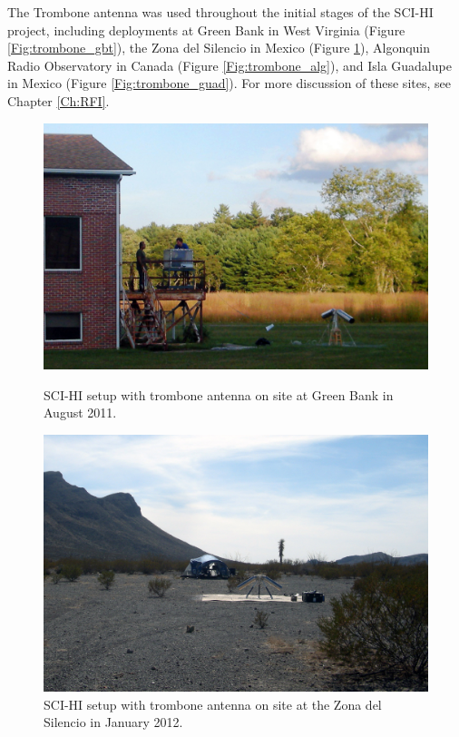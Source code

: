 The Trombone antenna was used throughout the initial stages of the SCI-HI project, including deployments at Green Bank in West Virginia (Figure \ref{Fig:trombone_gbt}), the Zona del Silencio in Mexico (Figure \ref{Fig:trombone_zds}), Algonquin Radio Observatory in Canada (Figure \ref{Fig:trombone_alg}), and Isla Guadalupe in Mexico (Figure \ref{Fig:trombone_guad}). For more discussion of these sites, see Chapter \ref{Ch:RFI}.

\begin{figure}[htb]
\centering
\begin{minipage}[b]{0.48\textwidth}
\centering
\includegraphics[width=0.95\linewidth]{SCIHI_system/figures/trombone_gbt.jpg}
\caption{SCI-HI setup with trombone antenna on site at Green Bank in August 2011.}
\label{Fig:trombone_gbt}
\end{minipage}%
\begin{minipage}[b]{0.02\textwidth}
\hspace{1cm}
\end{minipage}%
\begin{minipage}[b]{0.46\textwidth}
\centering
\includegraphics[width=0.95\linewidth]{SCIHI_system/figures/trombone_sys_ZdS.jpg}
\caption{SCI-HI setup with trombone antenna on site at the Zona del Silencio in January 2012.}
\label{Fig:trombone_zds}
\end{minipage}
\end{figure}


